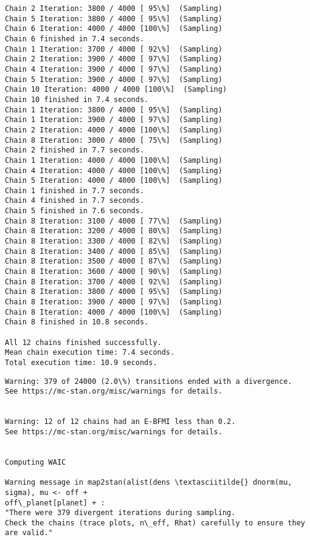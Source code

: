 \documentclass[11pt]{article}
\begin{document}
\begin{Verbatim}[commandchars=\\\{\}]
Chain 2 Iteration: 3800 / 4000 [ 95\%]  (Sampling)
Chain 5 Iteration: 3800 / 4000 [ 95\%]  (Sampling)
Chain 6 Iteration: 4000 / 4000 [100\%]  (Sampling)
Chain 6 finished in 7.4 seconds.
Chain 1 Iteration: 3700 / 4000 [ 92\%]  (Sampling)
Chain 2 Iteration: 3900 / 4000 [ 97\%]  (Sampling)
Chain 4 Iteration: 3900 / 4000 [ 97\%]  (Sampling)
Chain 5 Iteration: 3900 / 4000 [ 97\%]  (Sampling)
Chain 10 Iteration: 4000 / 4000 [100\%]  (Sampling)
Chain 10 finished in 7.4 seconds.
Chain 1 Iteration: 3800 / 4000 [ 95\%]  (Sampling)
Chain 1 Iteration: 3900 / 4000 [ 97\%]  (Sampling)
Chain 2 Iteration: 4000 / 4000 [100\%]  (Sampling)
Chain 8 Iteration: 3000 / 4000 [ 75\%]  (Sampling)
Chain 2 finished in 7.7 seconds.
Chain 1 Iteration: 4000 / 4000 [100\%]  (Sampling)
Chain 4 Iteration: 4000 / 4000 [100\%]  (Sampling)
Chain 5 Iteration: 4000 / 4000 [100\%]  (Sampling)
Chain 1 finished in 7.7 seconds.
Chain 4 finished in 7.7 seconds.
Chain 5 finished in 7.6 seconds.
Chain 8 Iteration: 3100 / 4000 [ 77\%]  (Sampling)
Chain 8 Iteration: 3200 / 4000 [ 80\%]  (Sampling)
Chain 8 Iteration: 3300 / 4000 [ 82\%]  (Sampling)
Chain 8 Iteration: 3400 / 4000 [ 85\%]  (Sampling)
Chain 8 Iteration: 3500 / 4000 [ 87\%]  (Sampling)
Chain 8 Iteration: 3600 / 4000 [ 90\%]  (Sampling)
Chain 8 Iteration: 3700 / 4000 [ 92\%]  (Sampling)
Chain 8 Iteration: 3800 / 4000 [ 95\%]  (Sampling)
Chain 8 Iteration: 3900 / 4000 [ 97\%]  (Sampling)
Chain 8 Iteration: 4000 / 4000 [100\%]  (Sampling)
Chain 8 finished in 10.8 seconds.

All 12 chains finished successfully.
Mean chain execution time: 7.4 seconds.
Total execution time: 10.9 seconds.

    \end{Verbatim}

    \begin{Verbatim}[commandchars=\\\{\}]
Warning: 379 of 24000 (2.0\%) transitions ended with a divergence.
See https://mc-stan.org/misc/warnings for details.


Warning: 12 of 12 chains had an E-BFMI less than 0.2.
See https://mc-stan.org/misc/warnings for details.


Computing WAIC

Warning message in map2stan(alist(dens \textasciitilde{} dnorm(mu, sigma), mu <- off +
off\_planet[planet] + :
"There were 379 divergent iterations during sampling.
Check the chains (trace plots, n\_eff, Rhat) carefully to ensure they are valid."
    \end{Verbatim}
\end{document}

